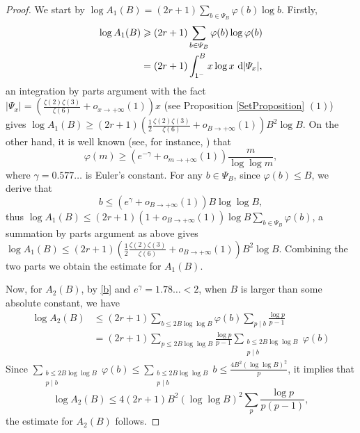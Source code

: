 \documentclass[11pt]{amsart}
\numberwithin{equation}{section}
\begin{document}
\begin{proof}
We start by $\log A_1(B) = (2r+1)\sum_{b \in \mathcal{\varPsi}_B} \varphi(b)\log b$. Firstly,
\begin{align*}
\log A_1(B) &\geqslant (2r+1)\sum_{b \in \mathcal{\varPsi}_B} \varphi(b)\log \varphi(b) \\
            &= (2r+1) \int_{1^{-}}^{B} x\log x ~{\rm d} | \mathcal{\varPsi}_x|,
\end{align*}
an integration by parts argument with the fact $| \mathcal{\varPsi}_x| = \left(\frac{\zeta(2)\zeta(3)}{\zeta(6)}+o_{x \rightarrow +\infty}(1)\right) x$ (see Proposition \ref{SetProposition} $(1)$) gives $\log A_1(B) \geqslant \left(2r+1\right)\left( \frac{1}{2} \frac{\zeta(2)\zeta(3)}{\zeta(6)} + o_{B \rightarrow + \infty}(1) \right) B^2 \log B$. On the other hand, it is well known (see, for instance, \cite[Thm 2.9]{MV06}) that
\[ \varphi(m) \geqslant \left( e^{-\gamma} + o_{m \rightarrow +\infty}(1) \right)\frac{m}{\log\log m}, \]
where $\gamma = 0.577\ldots$ is Euler's constant. For any $b \in \mathcal{\varPsi}_B$, since $\varphi(b) \leqslant B$, we derive that
\begin{equation} \label{b}
b \leqslant ( e^{\gamma}+o_{B \rightarrow +\infty}(1) ) B \log\log B,
\end{equation}
thus $\log A_1(B) \leqslant (2r+1)(1+o_{B\rightarrow +\infty}(1))\log B \sum_{b \in \mathcal{\varPsi}_B} \varphi(b)$, a summation by parts argument as above gives $\log A_1(B) \leqslant \left(2r+1\right)\left( \frac{1}{2} \frac{\zeta(2)\zeta(3)}{\zeta(6)} + o_{B \rightarrow + \infty}(1) \right) B^2 \log B$. Combining the two parts we obtain the estimate for $A_1(B)$.

Now, for $A_2(B)$, by \eqref{b} and $e^{\gamma} = 1.78\ldots < 2$, when $B$ is larger than some absolute constant, we have
\begin{align*}
\log A_2(B) &\leq (2r+1) \sum_{b \leqslant 2B\log\log B} \varphi(b) \sum_{p \mid b} \frac{\log p}{p-1} \\
&= (2r+1) \sum_{p \leqslant 2B\log\log B} \frac{\log p}{p-1} \sum_{\substack{b \leqslant 2B\log\log B \\ p \mid b}} \varphi(b)
\end{align*}
Since $\sum_{\substack{b \leqslant 2B\log\log B \\ p \mid b}} \varphi(b) \leqslant \sum_{\substack{b \leqslant 2B\log\log B \\ p \mid b}} b \leqslant \frac{4B^2 (\log\log B)^2}{p}$, it implies that
\[ \log A_2(B) \leqslant 4(2r+1) B^2 (\log\log B)^2 \sum_{p} \frac{\log p}{p(p-1)}  ,\]
the estimate for $A_2(B)$ follows.
\end{proof}
\smallskip
\end{document}
